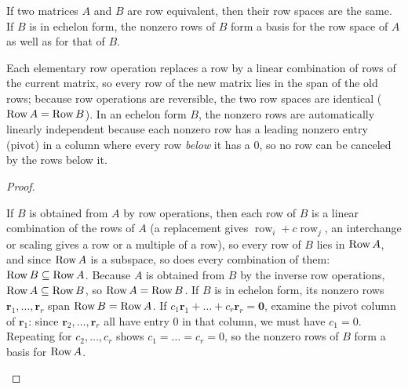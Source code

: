 \documentclass[10pt]{scrartcl}
\newcommand{\vv}[1]{\mathbf{#1}}
\begin{document}
\begin{theorem*}
  If two matrices $A$ and $B$ are row equivalent, then their row spaces are the same. If $B$ is in echelon form, the nonzero rows of $B$ form a basis for the row space of $A$ as well as for that of $B$.
\end{theorem*}
\begin{ideabox}
  Each elementary row operation replaces a row by a linear combination of rows of the current matrix, so every row of the new matrix lies in the span of the old rows; because row operations are reversible, the two row spaces are identical ($\operatorname{Row} A=\operatorname{Row} B$). In an echelon form $B$, the nonzero rows are automatically linearly independent because each nonzero row has a leading nonzero entry (pivot) in a column where every row \emph{below} it has a $0$, so no row can be canceled by the rows below it.
\end{ideabox}
\begin{proof}
  \begin{steps}
    \ii If $B$ is obtained from $A$ by row operations, then each row of $B$ is a linear combination of the rows of $A$ (a replacement gives $\operatorname{row}_i+c\operatorname{row}_j$, an interchange or scaling gives a row or a multiple of a row), so every row of $B$ lies in $\operatorname{Row} A$, and since $\operatorname{Row} A$ is a subspace, so does every combination of them: $\operatorname{Row} B\subseteq\operatorname{Row} A$. Because $A$ is obtained from $B$ by the inverse row operations, $\operatorname{Row} A\subseteq\operatorname{Row} B$, so $\operatorname{Row} A=\operatorname{Row} B$.
    \ii If $B$ is in echelon form, its nonzero rows $\vv r_1,\dots,\vv r_r$ span $\operatorname{Row} B=\operatorname{Row} A$. If $c_1\vv r_1+\dots+c_r\vv r_r=\vv 0$, examine the pivot column of $\vv r_1$: since $\vv r_2,\dots,\vv r_r$ all have entry $0$ in that column, we must have $c_1=0$. Repeating for $c_2,\dots,c_r$ shows $c_1=\dots=c_r=0$, so the nonzero rows of $B$ form a basis for $\operatorname{Row} A$.
  \end{steps}
\end{proof}
\end{document}
